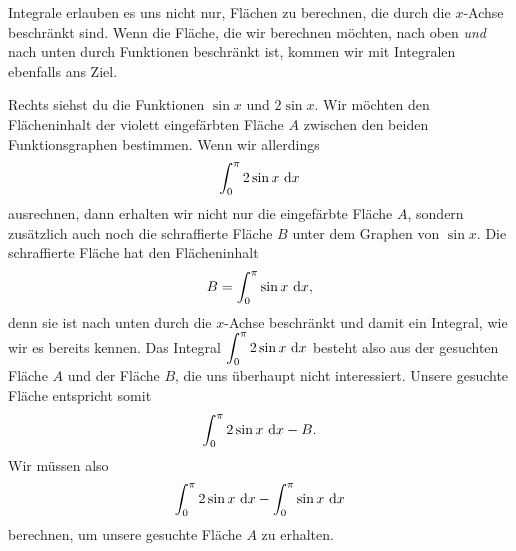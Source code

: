 \documentclass[../../main.tex]{subfiles}
\begin{document}
Integrale erlauben es uns nicht nur, Flächen zu berechnen, die durch die $x$-Achse beschränkt sind. Wenn die Fläche, die
wir berechnen möchten, nach oben \emph{und} nach unten durch Funktionen beschränkt ist, kommen wir mit Integralen
ebenfalls ans Ziel.

\begin{example}{}
    Rechts siehst du die Funktionen $\sin x$ und $2\sin x$. Wir möchten den Flächeninhalt der violett eingefärbten 
    Fläche $A$ zwischen den beiden Funktionsgraphen bestimmen. Wenn wir allerdings
    \[\int_0^{\pi}2\sin x\mathop{}\mathrm{d} x\]
    ausrechnen, dann erhalten wir nicht nur die eingefärbte Fläche $A$, sondern zusätzlich auch noch die schraffierte 
    Fläche $B$ unter dem Graphen von $\sin x$. Die schraffierte Fläche hat den Flächeninhalt
    \[B=\int_0^{\pi}\sin x\mathop{}\mathrm{d} x,\]
    denn sie ist nach unten durch die $x$-Achse beschränkt und damit ein Integral, wie wir es bereits kennen. Das
    Integral $\displaystyle \int_0^{\pi}2\sin x\mathop{}\mathrm{d} x$ besteht also aus der gesuchten Fläche $A$ und der Fläche 
    $B$, die uns überhaupt nicht interessiert. Unsere gesuchte Fläche entspricht somit
    \[\int_0^{\pi}2\sin x\mathop{}\mathrm{d} x-B.\]
    Wir müssen also
    \[\int_0^{\pi}2\sin x\mathop{}\mathrm{d} x-\int_0^{\pi}\sin x\mathop{}\mathrm{d} x\]
    berechnen, um unsere gesuchte Fläche $A$ zu erhalten.
\end{example}
\end{document}

